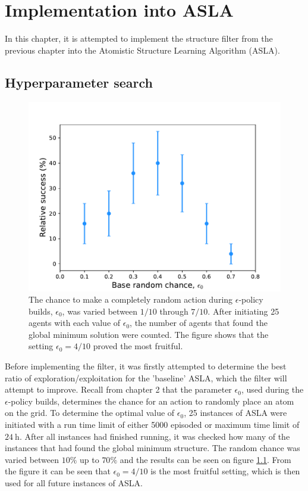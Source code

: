 \chapter{Implementation into ASLA}

In this chapter, it is attempted to implement the structure filter from the previous chapter into the Atomistic Structure Learning Algorithm (ASLA). 

\section{Hyperparameter search}
\begin{figure}
	\centering
	\includegraphics[width=0.8\columnwidth]{graphics/hypersearch_epsilon.pdf}
	\caption{The chance to make a completely random action during $\epsilon$-policy builds, $\epsilon_0$, was varied between $1/10$ through $7/10$. After initiating 25 agents with each value of $\epsilon_0$, the number of agents that found the global minimum solution were counted. The figure shows that the setting $\epsilon_0 = 4/10$ proved the most fruitful.}
	\label{fig:epsilon_variation}
\end{figure}

Before implementing the filter, it was firstly attempted to determine the best ratio of exploration/exploitation for the 'baseline' ASLA, which the filter will attempt to improve. Recall from chapter 2 that the parameter $\epsilon_0$, used during the $\epsilon$-policy builds, determines the chance for an action to randomly place an atom on the grid. To determine the optimal value of $\epsilon_0$, 25 instances of ASLA were initiated with a run time limit of either 5000 episoded or maximum time limit of $\SI{24}{\hour}$. After all instances had finished running, it was checked how many of the instances that had found the global minimum structure. The random chance was varied between $10\%$ up to $70\%$ and the results can be seen on figure \ref{fig:epsilon_variation}. From the figure it can be seen that $\epsilon_0 = 4/10$ is the most fruitful setting, which is then used for all future instances of ASLA.



